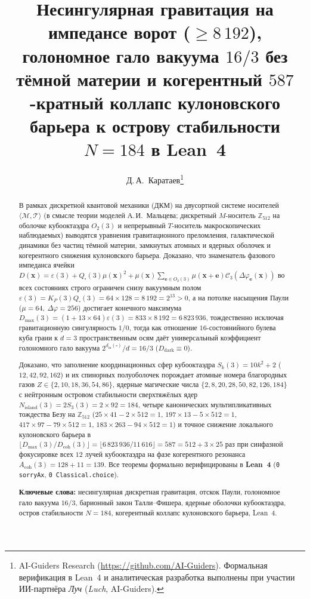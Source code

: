 \documentclass[11pt,a4paper]{article}
\title{\textbf{Несингулярная гравитация на импедансе ворот ($\ge 8\,192$), голономное гало вакуума $16/3$ без тёмной материи и когерентный $587$-кратный коллапс кулоновского барьера к острову стабильности $N = 184$ в Lean~4}}
\author{Д.\,А.~Каратаев\thanks{AI-Guiders Research (\url{https://github.com/AI-Guiders}). Формальная верификация в Lean~4 и аналитическая разработка выполнены при участии ИИ-партнёра \emph{Луч} (\emph{Luch}, AI-Guiders).}}
\date{}
\theoremstyle{plain}
\theoremstyle{definition}
\begin{document}
\maketitle

\begin{abstract}
В рамках дискретной квантовой механики (ДКМ) на двусортной системе носителей $\langle\mathcal{M},\mathcal{T}\rangle$ (в смысле теории моделей А.\,И.~Мальцева; дискретный $M$-носитель $\mathbb{Z}_{512}$ на оболочке кубооктаэдра $O_2(3)$ и непрерывный $T$-носитель макроскопических наблюдаемых) выводятся уравнения гравитационного преломления, галактической динамики без частиц тёмной материи, замкнутых атомных и ядерных оболочек и когерентного снижения кулоновского барьера. Доказано, что знаменатель фазового импеданса ячейки $D(\mathbf{x}) = \varepsilon(3) + Q_\square(3)\mu(\mathbf{x})^2 + \mu(\mathbf{x})\sum_{\mathbf{e}\in O_2(3)}\mu(\mathbf{x}+\mathbf{e})\mathcal{C}_3(\Delta\varphi_{\mathbf{e}}(\mathbf{x}))$ во всех состояниях строго ограничен снизу вакуумным полом $\varepsilon(3) = K_P(3)Q_\square(3) = 64\times 128 = 8\,192 = 2^{13} > 0$, а на потолке насыщения Паули ($\mu=64,\ \Delta\varphi=256$) достигает конечного максимума $D_{\max}(3) = (1 + 13\times 64)\varepsilon(3) = 833\times 8\,192 = 6\,823\,936$, тождественно исключая гравитационную сингулярность $1/0$, тогда как отношение $16$-состоянийного булева куба грани к $d=3$ пространственным осям даёт универсальный коэффициент голономного гало вакуума $2^{d_{\mathrm{in}}(\square)}/d = 16/3$ ($D_{\mathrm{dark}}\equiv 0$).

Доказано, что заполнение координационных сфер кубооктаэдра $S_k(3) = 10k^2 + 2$ ($12,42,92,162$) и их спинорных полуоболочек порождает атомные номера благородных газов $Z\in\{2,10,18,36,54,86\}$, ядерные магические числа $\{2,8,20,28,50,82,126,184\}$ с нейтронным островом стабильности сверхтяжёлых ядер $N_{\mathrm{island}}(3) = 2S_3(3) = 2\times 92 = 184$, четыре канонических мультипликативных тождества Безу на $\mathbb{Z}_{512}$ ($25\times 41 - 2\times 512 = 1$, $197\times 13 - 5\times 512 = 1$, $417\times 97 - 79\times 512 = 1$, $183\times 263 - 94\times 512 = 1$) и точное снижение локального кулоновского барьера в $\lfloor D_{\max}(3)/D_{\mathrm{coh}}(3)\rfloor = \lfloor 6\,823\,936/11\,616\rfloor = 587 = 512 + 3\times 25$ раз при синфазной фокусировке всех $12$ лучей кубооктаэдра на фазе когерентного резонанса $A_{\mathrm{coh}}(3) = 128 + 11 = 139$. Все теоремы формально верифицированы в \textbf{Lean~4} (\texttt{0 sorryAx}, \texttt{0 Classical.choice}).

\medskip\noindent
\textbf{Ключевые слова:} несингулярная дискретная гравитация, отскок Паули, голономное гало вакуума $16/3$, барионный закон Талли--Фишера, ядерные оболочки кубооктаэдра, остров стабильности $N=184$, когерентный коллапс кулоновского барьера, Lean~4.
\end{abstract}
\end{document}
